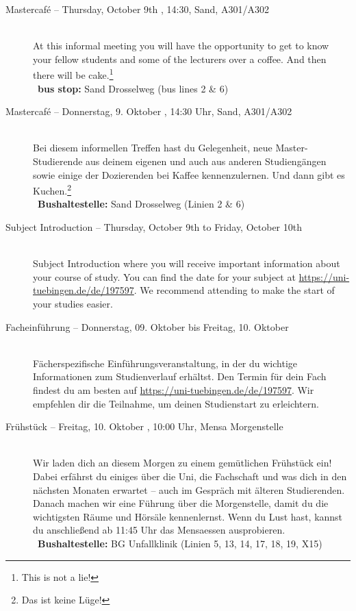 \begin{description}
\ifmaster
    \ifml
        \item[Mastercafé -- Thursday, October 9th \YEAR, 14:30, Sand, A301/A302]\ \\
        At this informal meeting you will have the opportunity to get to know your fellow students and some of the lecturers over a coffee. And then there will be cake.\footnote{This is not a lie!}\\
        ~\textbf{bus stop:} Sand Drosselweg (bus lines 2 \& 6)
   \else
        \item[Mastercafé -- Donnerstag, 9. Oktober \YEAR, 14:30 Uhr, Sand, A301/A302]\ \\
        Bei diesem informellen Treffen hast du Gelegenheit, neue Master-Studierende aus deinem eigenen und auch aus anderen Studiengängen sowie einige der Dozierenden bei Kaffee kennenzulernen. Und dann gibt es Kuchen.\footnote{Das ist keine Lüge!}\\
        ~\textbf{Bushaltestelle:} Sand Drosselweg (Linien 2 \& 6)
   \fi
\fi

\ifmaster \ifinfo \iflehramt \else \pagebreak \fi \fi \fi
\ifmaster \ifmedien \pagebreak \fi \fi
\ifmaster \ifmedinfo \pagebreak \fi \fi
\ifmaster \ifkogwiss \pagebreak \fi \fi

\ifml
    \item[Subject Introduction -- Thursday, October 9th to Friday, October 10th \YEAR]\ \\ 
    Subject Introduction where you will receive important information about your course of study. You can find the date for your subject at \url{https://uni-tuebingen.de/de/197597}.
    We recommend attending to make the start of your studies easier.
\else    
    \item[Facheinführung -- Donnerstag, 09. Oktober bis Freitag, 10. Oktober \YEAR]\ \\ 
    Fächerspezifische Einführungsveranstaltung, in der du wichtige Informationen zum Studienverlauf erhältst. Den Termin für dein Fach findest du am besten auf \url{https://uni-tuebingen.de/de/197597}.
    Wir empfehlen dir die Teilnahme, um deinen Studienstart zu erleichtern.
\fi

\ifbachelor
    \item[Frühstück -- Freitag, 10. Oktober \YEAR, 10:00 Uhr, Mensa Morgenstelle]\ \\
    Wir laden dich an diesem Morgen zu einem gemütlichen Frühstück ein! Dabei erfährst du einiges über die Uni, die Fachschaft und was dich in den nächsten Monaten erwartet -- auch im Gespräch mit älteren Studierenden.
    Danach machen wir eine Führung über die Morgenstelle, damit du die wichtigsten Räume und Hörsäle kennenlernst.
    Wenn du Lust hast, kannst du anschließend ab 11:45 Uhr das Mensaessen ausprobieren.\\
    ~\textbf{Bushaltestelle:} BG Unfallklinik (Linien 5, 13, 14, 17, 18, 19, X15)
\fi


\end{description}
